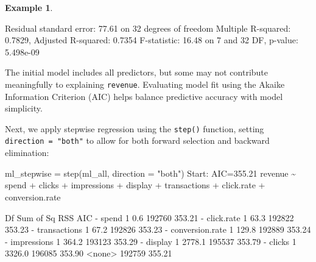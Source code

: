 \documentclass[
  11pt,
]{book}
\makeatletter
\newenvironment{Shaded}{}{}
\newcommand{\AttributeTok}[1]{#1}
\newcommand{\DecValTok}[1]{#1}
\newcommand{\FloatTok}[1]{#1}
\newcommand{\FunctionTok}[1]{#1}
\newcommand{\NormalTok}[1]{#1}
\newcommand{\OtherTok}[1]{\textcolor[rgb]{0.39,0.39,0.39}{#1}}
\newcommand{\SpecialCharTok}[1]{\textcolor[rgb]{0.39,0.39,0.39}{#1}}
\newcommand{\StringTok}[1]{\textcolor[rgb]{0.39,0.39,0.39}{#1}}
\newenvironment{kframe}{%
\medskip{}
\setlength{\fboxsep}{.8em}
 \def\at@end@of@kframe{}%
 \ifinner\ifhmode%
  \def\at@end@of@kframe{\end{minipage}}%
  \begin{minipage}{\columnwidth}%
 \fi\fi%
 \def\FrameCommand##1{\hskip\@totalleftmargin \hskip-\fboxsep
 \colorbox{shadecolor}{##1}\hskip-\fboxsep
     \hskip-\linewidth \hskip-\@totalleftmargin \hskip\columnwidth}%
 \MakeFramed {\advance\hsize-\width
   \@totalleftmargin\z@ \linewidth\hsize
   \@setminipage}}%
 {\par\unskip\endMakeFramed%
 \at@end@of@kframe}
\renewenvironment{Shaded}{\begin{kframe}}{\end{kframe}}
\theoremstyle{definition}
\theoremstyle{definition}
\newtheorem{example}{Example}[chapter]
\theoremstyle{definition}
\theoremstyle{definition}
\theoremstyle{remark}
\makeatother
\begin{document}
\begin{example}
\begin{Shaded}
\begin{Highlighting}[]
\NormalTok{   Residual standard error}\SpecialCharTok{:} \FloatTok{77.61}\NormalTok{ on }\DecValTok{32}\NormalTok{ degrees of freedom}
\NormalTok{   Multiple R}\SpecialCharTok{{-}}\NormalTok{squared}\SpecialCharTok{:}  \FloatTok{0.7829}\NormalTok{, Adjusted R}\SpecialCharTok{{-}}\NormalTok{squared}\SpecialCharTok{:}  \FloatTok{0.7354} 
\NormalTok{   F}\SpecialCharTok{{-}}\NormalTok{statistic}\SpecialCharTok{:} \FloatTok{16.48}\NormalTok{ on }\DecValTok{7}\NormalTok{ and }\DecValTok{32}\NormalTok{ DF,  p}\SpecialCharTok{{-}}\NormalTok{value}\SpecialCharTok{:} \FloatTok{5.498e{-}09}
\end{Highlighting}
\end{Shaded}

The initial model includes all predictors, but some may not contribute meaningfully to explaining \texttt{revenue}. Evaluating model fit using the Akaike Information Criterion (AIC) helps balance predictive accuracy with model simplicity.

Next, we apply stepwise regression using the \texttt{step()} function, setting \texttt{direction\ =\ "both"} to allow for both forward selection and backward elimination:

\begin{Shaded}
\begin{Highlighting}[]
\NormalTok{ml\_stepwise }\OtherTok{=} \FunctionTok{step}\NormalTok{(ml\_all, }\AttributeTok{direction =} \StringTok{"both"}\NormalTok{)}
\NormalTok{   Start}\SpecialCharTok{:}\NormalTok{  AIC}\OtherTok{=}\FloatTok{355.21}
\NormalTok{   revenue }\SpecialCharTok{\textasciitilde{}}\NormalTok{ spend }\SpecialCharTok{+}\NormalTok{ clicks }\SpecialCharTok{+}\NormalTok{ impressions }\SpecialCharTok{+}\NormalTok{ display }\SpecialCharTok{+}\NormalTok{ transactions }\SpecialCharTok{+} 
\NormalTok{       click.rate }\SpecialCharTok{+}\NormalTok{ conversion.rate}
   
\NormalTok{                     Df Sum of Sq    RSS    AIC}
   \SpecialCharTok{{-}}\NormalTok{ spend            }\DecValTok{1}       \FloatTok{0.6} \DecValTok{192760} \FloatTok{353.21}
   \SpecialCharTok{{-}}\NormalTok{ click.rate       }\DecValTok{1}      \FloatTok{63.3} \DecValTok{192822} \FloatTok{353.23}
   \SpecialCharTok{{-}}\NormalTok{ transactions     }\DecValTok{1}      \FloatTok{67.2} \DecValTok{192826} \FloatTok{353.23}
   \SpecialCharTok{{-}}\NormalTok{ conversion.rate  }\DecValTok{1}     \FloatTok{129.8} \DecValTok{192889} \FloatTok{353.24}
   \SpecialCharTok{{-}}\NormalTok{ impressions      }\DecValTok{1}     \FloatTok{364.2} \DecValTok{193123} \FloatTok{353.29}
   \SpecialCharTok{{-}}\NormalTok{ display          }\DecValTok{1}    \FloatTok{2778.1} \DecValTok{195537} \FloatTok{353.79}
   \SpecialCharTok{{-}}\NormalTok{ clicks           }\DecValTok{1}    \FloatTok{3326.0} \DecValTok{196085} \FloatTok{353.90}
   \SpecialCharTok{\textless{}}\NormalTok{none}\SpecialCharTok{\textgreater{}}                         \DecValTok{192759} \FloatTok{355.21}
   

\end{Highlighting}
\end{Shaded}
\end{example}
\end{document}
